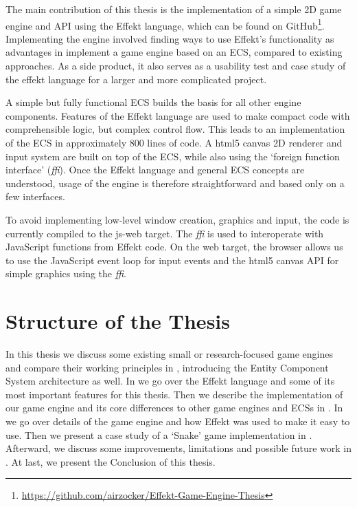 The main contribution of this thesis is the implementation of a simple 2D game engine and API using the Effekt language, which can be found on GitHub\footnote{\url{https://github.com/airzocker/Effekt-Game-Engine-Thesis}}. Implementing the engine involved finding ways to use Effekt's functionality as advantages in implement a game engine based on an ECS, compared to existing approaches. As a side product, it also serves as a usability test and case study of the effekt language for a larger and more complicated project.

A simple but fully functional ECS builds the basis for all other engine components. Features of the Effekt language are used to make compact code with comprehensible logic, but complex control flow. This leads to an implementation of the ECS in approximately 800 lines of code. A html5 \textsf{canvas} 2D renderer and input system are built on top of the ECS, while also using the `foreign function interface' (\textit{ffi}). Once the Effekt language and general ECS concepts are understood, usage of the engine is therefore straightforward and based only on a few interfaces.

To avoid implementing low-level window creation, graphics and input, the code is currently compiled to the \textsf{js-web} target. The \textit{ffi} is used to interoperate with JavaScript functions from Effekt code. On the web target, the browser allows us to use the JavaScript event loop for input events and the html5 \textsf{canvas} API for simple graphics using the \textit{ffi}.

\section*{Structure of the Thesis}

In this thesis we discuss some existing small or research-focused game engines and compare their working principles in , introducing the Entity Component System architecture as well. In  we go over the Effekt language and some of its most important features for this thesis. Then we describe the implementation of our game engine and its core differences to other game engines and ECSs in . In  we go over details of the game engine and how Effekt was used to make it easy to use. Then we present a case study of a `Snake' game implementation in . Afterward, we discuss some improvements, limitations and possible future work in . At last, we present the Conclusion of this thesis.
